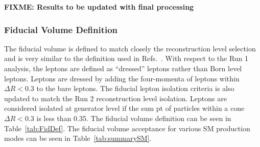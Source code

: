 \textbf{FIXME: Results to be updated with final processing}

\subsubsection{Fiducial Volume Definition}

The fiducial volume is defined to match closely the reconstruction level selection and is very similar to the definition
used in Refs.~\cite{CMSH4lFiducial8TeV}. With respect to the Run 1 analysis, 
the leptons are defined as ``dressed'' leptons rather than Born level leptons. 
Leptons are dressed by adding the four-momenta of leptons within $\Delta R<0.3$ to the bare leptons.  
The fiducial lepton isolation criteria is also updated to match the Run 2 reconstruction level isolation. Leptons are considered isolated at generator level if the sum pt of particles within a cone  $\Delta R<0.3$ is less than 0.35.
The fiducial volume definition can be seen in Table~\ref{tab:FidDef}. 
The fiducial volume acceptance for various SM production modes can be seen in Table~\ref{tab:summarySM}.

